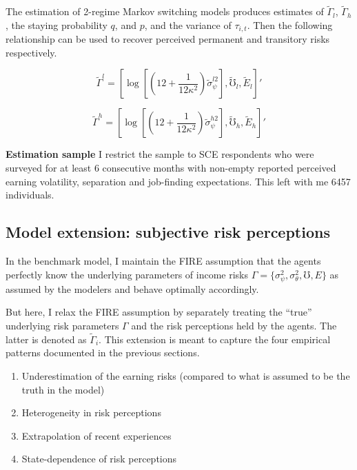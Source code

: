 The estimation of 2-regime Markov switching models produces estimates of $\tilde \Gamma_l$, $\tilde \Gamma_h$, the staying probability $q$, and $p$, and the variance of $\tau_{i,t}$. Then the following relationship can be used to recover perceived permanent and transitory risks respectively. 

$$\tilde \Gamma^l=[\log[(12+\frac{1}{12\kappa^2})\tilde \sigma^{l2}_{\psi}],\tilde \mho_l,\tilde E_l]'$$

$$\tilde \Gamma^h = [\log[(12+\frac{1}{12\kappa^2})\tilde \sigma^{h2}_{\psi}],\tilde \mho_h,\tilde E_h]'$$

\textbf{Estimation sample} I restrict the sample to SCE respondents who were surveyed for at least 6 consecutive months with non-empty reported perceived earning volatility, separation and job-finding expectations. This left with me 6457 individuals.



\subsection{Model extension: subjective risk perceptions}
\label{appendix:subjective_model}

In the benchmark model, I maintain the FIRE assumption that the agents perfectly know the underlying parameters of income risks $\Gamma =\{\sigma^2_\psi,\sigma^2_\theta,\mho,E\}$ as assumed by the modelers and behave optimally accordingly. 

But here, I relax the FIRE assumption by separately treating the ``true'' underlying risk parameters $\Gamma$ and the risk perceptions held by the agents. The latter is denoted as $\tilde \Gamma_i$. This extension is meant to capture the four empirical patterns documented in the previous sections. 

\begin{enumerate}
    \item Underestimation of the earning risks (compared to what is assumed to be the truth in the model) 
    \item Heterogeneity in risk perceptions 
    \item Extrapolation of recent experiences
    \item State-dependence of risk perceptions 
\end{enumerate}

